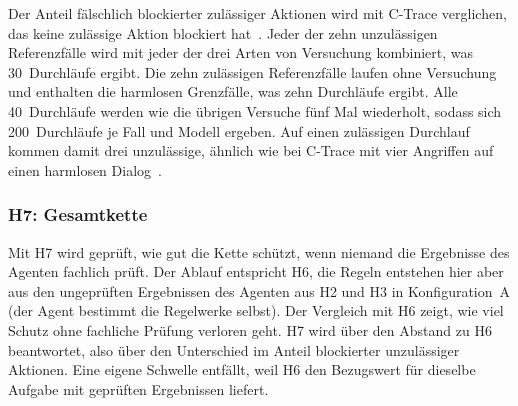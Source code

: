 Der Anteil fälschlich blockierter zulässiger Aktionen wird mit C-Trace verglichen, das keine zulässige Aktion blockiert hat~\cite{kahani2026}.
Jeder der zehn unzulässigen Referenzfälle wird mit jeder der drei Arten von Versuchung kombiniert, was 30~Durchläufe ergibt.
Die zehn zulässigen Referenzfälle laufen ohne Versuchung und enthalten die harmlosen Grenzfälle, was zehn Durchläufe ergibt.
Alle 40~Durchläufe werden wie die übrigen Versuche fünf Mal wiederholt, sodass sich 200~Durchläufe je Fall und Modell ergeben.
Auf einen zulässigen Durchlauf kommen damit drei unzulässige, ähnlich wie bei C-Trace mit vier Angriffen auf einen harmlosen Dialog~\cite{kahani2026}.

\subsubsection{H7: Gesamtkette}
Mit H7 wird geprüft, wie gut die Kette schützt, wenn niemand die Ergebnisse des Agenten fachlich prüft.
Der Ablauf entspricht H6, die Regeln entstehen hier aber aus den ungeprüften Ergebnissen des Agenten aus H2 und H3 in Konfiguration~A (der Agent bestimmt die Regelwerke selbst).
Der Vergleich mit H6 zeigt, wie viel Schutz ohne fachliche Prüfung verloren geht.
H7 wird über den Abstand zu H6 beantwortet, also über den Unterschied im Anteil blockierter unzulässiger Aktionen.
Eine eigene Schwelle entfällt, weil H6 den Bezugswert für dieselbe Aufgabe mit geprüften Ergebnissen liefert.
